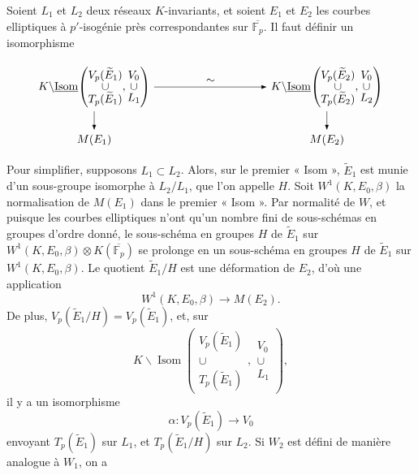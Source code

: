 \documentclass[11pt]{article}
\newcommand{\Fp}{\mathbb{F}_{p}}
\newcommand{\Isom}{\operatorname{Isom}}
\newcommand{\wt}{\widetilde}
\begin{document}
Soient \(L_1\) et \(L_2\) deux réseaux \(K\)-invariants, et soient \(E_1\) et \(E_2\) les courbes elliptiques à \(p'\)-isogénie près correspondantes sur \(\overline{\Fp}\). Il faut définir un isomorphisme

\[
\begin{tikzpicture}[x=1cm,y=1cm,>=Latex,baseline=(current bounding box.center)]
  \node (A) at (0,1.2) {$K\backslash\underline{\operatorname{Isom}}\!\left(\begin{matrix}V_p(\widetilde E_1)\\[-2pt]\cup\\[-2pt]T_p(\widetilde E_1)\end{matrix},\begin{matrix}V_0\\[-2pt]\cup\\[-2pt]L_1\end{matrix}\right)$};
  \node (B) at (7.2,1.2) {$K\backslash\underline{\operatorname{Isom}}\!\left(\begin{matrix}V_p(\widetilde E_2)\\[-2pt]\cup\\[-2pt]T_p(\widetilde E_2)\end{matrix},\begin{matrix}V_0\\[-2pt]\cup\\[-2pt]L_2\end{matrix}\right)$};
  \node (M1) at (0,-0.45) {$M(E_1)$};
  \node (M2) at (7.2,-0.45) {$M(E_2)$};
  \draw[->] (A) -- node[above] {$\sim$} (B);
  \draw[->] (A) -- (M1);
  \draw[->] (B) -- (M2);
\end{tikzpicture}
\]

Pour simplifier, supposons \(L_1\subset L_2\). Alors, sur le premier « Isom », \(\wt E_1\) est munie d'un sous-groupe isomorphe à \(L_2/L_1\), que l'on appelle \(H\). Soit \(W^1(K,E_0,\beta)\) la normalisation de \(M(E_1)\) dans le premier « Isom ». Par normalité de \(W\), et puisque les courbes elliptiques n'ont qu'un nombre fini de sous-schémas en groupes d'ordre donné, le sous-schéma en groupes \(H\) de \(\wt E_1\) sur \(W^1(K,E_0,\beta)\otimes K(\overline{\Fp})\) se prolonge en un sous-schéma en groupes \(H\) de \(\wt E_1\) sur \(W^1(K,E_0,\beta)\). Le quotient \(\wt E_1/H\) est une déformation de \(E_2\), d'où une application
\[
W^1(K,E_0,\beta)\longrightarrow M(E_2).
\]
De plus, \(V_p(\wt E_1/H)=V_p(\wt E_1)\), et, sur
\[
K\backslash\Isom\!\left(
\begin{matrix}V_p(\wt E_1)\\[-2pt]\cup\\[-2pt]T_p(\wt E_1)\end{matrix},
\begin{matrix}V_0\\[-2pt]\cup\\[-2pt]L_1\end{matrix}\right),
\]
il y a un isomorphisme
\[
\alpha:V_p(\wt E_1)\to V_0
\]
envoyant \(T_p(\wt E_1)\) sur \(L_1\), et \(T_p(\wt E_1/H)\) sur \(L_2\). Si \(W_2\) est défini de manière analogue à \(W_1\), on a
\end{document}
